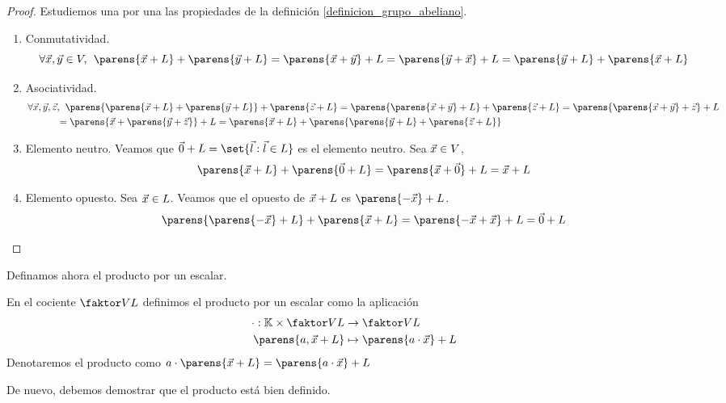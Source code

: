 \documentclass[../algebra_lineal.tex]{subfiles}
\begin{document}
\begin{proof}
    Estudiemos una por una las propiedades de la definición \ref{definicion_grupo_abeliano}.

    \begin{enumerate}
        \item Conmutatividad. 
        \[
            \forall \vx, \vy \in V, \spc \parens{\vx + L} + \parens{\vy + L} = \parens{\vx + \vy} + L = \parens{\vy + \vx} + L = \parens{\vy + L} + \parens{\vx + L}    
        \] 
        \item Asociatividad.
        \begin{align*}
            \forall \vx, \vy, \vz &, \spc \parens{\parens{\vx + L} + \parens{\vy + L}} + \parens{\vz + L} = \parens{\parens{\vx + \vy} + L} + \parens{\vz + L} = \parens{\parens{\vx + \vy} + \vz} + L \\
            &= \parens{\vx + \parens{\vy + \vz}} + L = \parens{\vx + L} + \parens{\parens{\vy + L} + \parens{\vz + L}}
        \end{align*}
        \item Elemento neutro. Veamos que $\zv + L = \set{\vec{l} : \vec{l} \in L}$ es el elemento neutro. Sea $\vec{x} \in V$,
        \[
            \parens{\vx + L} + \parens{\zv + L} = \parens{\vx + \zv} + L = \vx + L
        \]
        \item Elemento opuesto. Sea $\vec{x} \in L$. Veamos que el opuesto de $\vec{x} + L$ es $\parens{-\vx} + L$.
        \[
            \parens{\parens{-\vx} + L} + \parens{\vx + L} = \parens{-\vx + \vx} + L = \zv + L
        \]
    \end{enumerate}
\end{proof}

Definamos ahora el producto por un escalar. 
\begin{definition}
    \label{definicion_producto_escalar_cociente}
    En el cociente $\qs{V}{L}$ definimos el producto por un escalar como la aplicación
    \begin{align*}
        \cdot : \K \times \qs{V}{L} &\to \qs{V}{L} \\
                \parens{a, \vx + L}                    &\mapsto \parens{a \cdot \vx} + L
    \end{align*}
    Denotaremos el producto como $a \cdot \parens{\vx + L} = \parens{a \cdot \vx} + L$
\end{definition}

De nuevo, debemos demostrar que el producto está bien definido.
\end{document}
